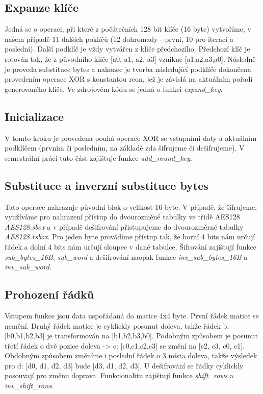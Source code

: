 \documentclass[12pt, a4paper]{article}
\begin{document}
\subsection{Expanze klíče}
Jedná se o operaci, při které z počátečních 128 bit klíče (16 byte) vytvoříme, v našem případě 11 dalších poklíčů
(12 dohromady - první, 10 pro iteraci a poslední). Další podklíč je vždy vytvářen z klíče předchozího. Předchozí
klíč je rotován tak, že z původního klíče [a0, a1, a2, a3] vznikne [a1,a2,a3,a0]. Následně je proveda substituce bytes
a nakonec je tvorba následující podklíče dokončena provedením operace XOR s konstantou rcon, jež je závislá na aktuálním
pořadí generovaného klíče. Ve zdrojovém kódu se jedná o funkci \textit{expand\_key}.

\subsection{Inicializace}
V tomto kroku je provedena pouhá operace XOR se vstupními daty a aktuálním podklíčem (prvním či posledním, na základě zda
šifrujeme či dešifrujeme). V semestrální práci tuto část zajištuje funkce \textit{add\_round\_key}.

\subsection{Substituce a inverzní substituce bytes}
Tato operace nahrazuje původní blok o velikost 16 byte. V případě, že šifrujeme, využíváme pro nahrazení přístup do
dvourozměné tabulky ve třídě AES128 \textit{AES128.sbox} a v případě dešifrování přistupujeme do dvourozměrné tabulky
\textit{AES128.rsbox}. Pro jeden byte provádíme přístup tak, že horní 4 bits nám určují řádek a dolní 4 bits nám určují
sloupec v dané tabulce. Šifrování zajištují funkce \textit{sub\_bytes\_16B}, \textit{sub\_word} a dešifrování naopak
funkce \textit{inv\_sub\_bytes\_16B} a \textit{inv\_sub\_word}.

\subsection{Prohození řádků}
Vstupem funkce jsou data uspořádaná do matice 4x4 byte. První řádek matice se nemění. Druhý řádek matice je cyklickly
posunut doleva, takže řádek b: [b0,b1,b2,b3] je transformován na [b1,b2,b3,b0]. Podobným způsobem je posunut třetí řádek
o dvě pozice doleva -> c: [c0,c1,c2,c3] se změní na [c2, c3, c0, c1]. Obdobným způsobem změníme i poslední řádek o 3
místa doleva, takže výsledek pro d: [d0, d1, d2, d3] bude [d3, d1, d2, d3]. U dešifrování se řádky cyklickly posouvají
pro změnu doprava. Funkcionalitu zajištují funkce \textit{shift\_rows} a  \textit{inv\_shift\_rows}.
\end{document}
